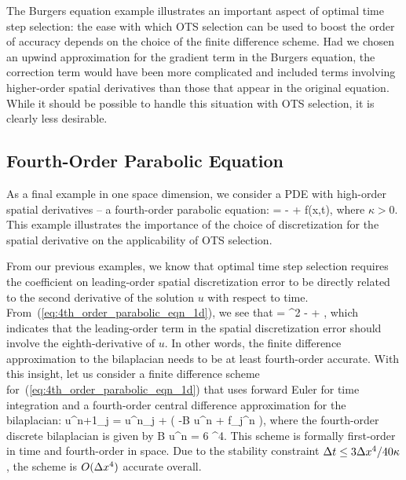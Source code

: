 \documentclass[fleqn,12pt,twoside]{article}
\begin{document}
The Burgers equation example illustrates an important aspect of optimal time 
step selection: the ease with which OTS selection can be used to boost the 
order of accuracy depends on the choice of the finite difference scheme.  
Had we chosen an upwind approximation for the gradient term in the Burgers 
equation, the correction term would have been more complicated and included 
terms involving higher-order spatial derivatives than those that appear in the
original equation.  While it should be possible to handle this situation with 
OTS selection, it is clearly less desirable.


\subsection{Fourth-Order Parabolic Equation}
As a final example in one space dimension, we consider a PDE with high-order
spatial derivatives -- a fourth-order parabolic equation: 
\beq
   = -\kappa {} + f(x,t), 
  \label{eq:4th_order_parabolic_eqn_1d}
\eeq
where $\kappa > 0$.  This example illustrates the importance of the choice of
discretization for the spatial derivative on the applicability of OTS selection.

From our previous examples, we know that optimal time step selection requires 
the coefficient on leading-order spatial discretization error to be directly 
related to the second derivative of the solution $u$ with respect to time.  
From~(\ref{eq:4th_order_parabolic_eqn_1d}), we see that 
\beq
   = 
    \kappa^2  
  - \kappa {} 
  + 
  \label{eq:4th_order_parabolic_eqn_1d_second_time_derivative},
\eeq
which indicates that the leading-order term in the spatial discretization 
error should involve the eighth-derivative of $u$.  In other words, the
finite difference approximation to the bilaplacian needs to be at least 
fourth-order accurate.  With this insight, let us consider a finite 
difference scheme for~(\ref{eq:4th_order_parabolic_eqn_1d}) that 
uses forward Euler for time integration and a fourth-order central 
difference approximation for the bilaplacian:
\beq
  u^{n+1}_j = u^{n}_j + \dt \left( -\kappa B u^n + f_j^n \right), 
  \label{eq:4th_order_parabolic_eqn_1d_FD_scheme}
\eeq
where the fourth-order discrete bilaplacian is given by
\beq
  B u^n = 
               {6 \dx^4}.
\eeq
This scheme is formally first-order in time and fourth-order in space.  
Due to the stability constraint $\Delta t \le 3\Delta x^4/40 \kappa$, the scheme is 
$O(\Delta x^4)$ accurate overall.
\end{document}
